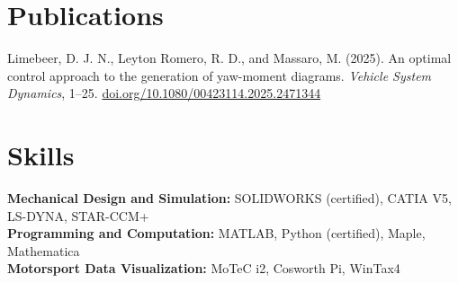 \documentclass[12pt,letterpaper]{article} %
\begin{document}
\section*{Publications}

Limebeer, D. J. N., Leyton Romero, R. D., and Massaro, M. (2025). An optimal control approach to the generation of yaw-moment diagrams. \textit{Vehicle System Dynamics}, 1–25. \href{https://doi.org/10.1080/00423114.2025.2471344}{doi.org/10.1080/00423114.2025.2471344}

\vspace{-10.5pt} %


\section*{Skills}
\textbf{Mechanical Design and Simulation:} SOLIDWORKS (certified), CATIA V5, LS-DYNA, STAR-CCM+ \\
\textbf{Programming and Computation:} MATLAB, Python (certified), Maple, Mathematica \\
\textbf{Motorsport Data Visualization:} MoTeC i2, Cosworth Pi, WinTax4 \\

\vspace{-10.5pt} %

\end{document}
